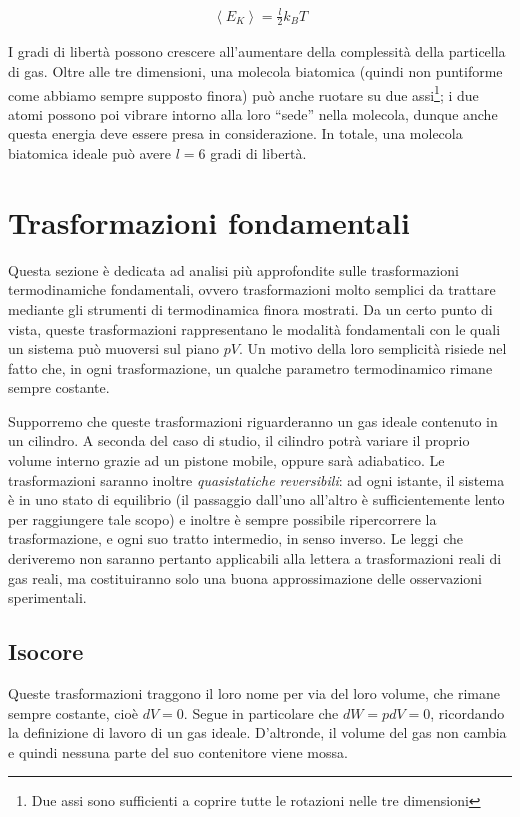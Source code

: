 \begin{align}
    \left\langle E_K \right\rangle = \frac{l}{2}k_BT
\end{align}

I gradi di libertà possono crescere all'aumentare della complessità
della particella di gas. Oltre alle tre dimensioni, una molecola
biatomica (quindi non puntiforme come abbiamo sempre supposto finora)
può anche ruotare su due assi\footnote{Due assi sono sufficienti a
coprire tutte le rotazioni nelle tre dimensioni}; i due atomi possono
poi vibrare intorno alla loro ``sede'' nella molecola, dunque anche
questa energia deve essere presa in considerazione. In totale, una
molecola biatomica ideale può avere $l = 6$ gradi di libertà.






\section{Trasformazioni fondamentali}
Questa sezione è dedicata ad analisi più approfondite sulle trasformazioni
termodinamiche fondamentali, ovvero trasformazioni molto semplici da
trattare mediante gli strumenti di termodinamica finora mostrati. Da
un certo punto di vista, queste trasformazioni rappresentano le modalità
fondamentali con le quali un sistema può muoversi sul piano $pV$. Un
motivo della loro semplicità risiede nel fatto che, in ogni trasformazione,
un qualche parametro termodinamico rimane sempre costante.

Supporremo che queste trasformazioni riguarderanno un gas ideale
contenuto in un cilindro. A seconda del caso di studio, il cilindro
potrà variare il proprio volume interno grazie ad un pistone mobile,
oppure sarà adiabatico. Le trasformazioni saranno inoltre \textit{quasistatiche
reversibili}: ad ogni istante, il sistema è in uno stato di
equilibrio (il passaggio dall'uno all'altro è sufficientemente lento
per raggiungere tale scopo) e inoltre è sempre possibile ripercorrere
la trasformazione, e ogni suo tratto intermedio, in senso inverso.
Le leggi che deriveremo non saranno pertanto applicabili alla lettera
a trasformazioni reali di gas reali, ma costituiranno solo una buona
approssimazione delle osservazioni sperimentali.


\subsection{Isocore}
Queste trasformazioni traggono il loro nome per via del loro volume,
che rimane sempre costante, cioè $dV = 0$. Segue in particolare che
$dW = pdV = 0$, ricordando la definizione di lavoro di un gas ideale.
D'altronde, il volume del gas non cambia e quindi nessuna parte del
suo contenitore viene mossa.

